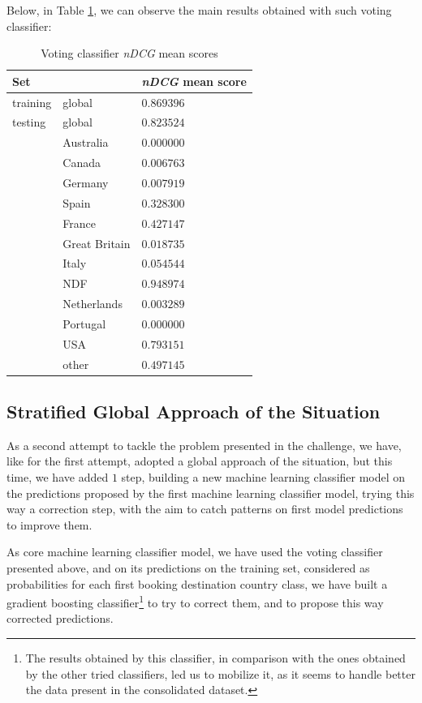 \documentclass[twocolumn, switch]{article}
\begin{document}
Below, in Table \ref{tab:vc}, we can observe the main results obtained with such voting classifier:

\begin{table}[H]
\caption{Voting classifier \textit{nDCG} mean scores}
\centering
\begin{tabular}{lll}
\toprule
Set & & \textit{nDCG} mean score \\
\midrule
training & global & $0.869396$ \\
testing & global & $0.823524$ \\
& Australia & $0.000000$ \\
& Canada & $0.006763$ \\
& Germany & $0.007919$ \\
& Spain & $0.328300$ \\
& France & $0.427147$ \\
& Great Britain & $0.018735$ \\
& Italy & $0.054544$ \\
& NDF & $0.948974$ \\
& Netherlands & $0.003289$ \\
& Portugal & $0.000000$ \\
& USA & $0.793151$ \\
& other & $0.497145$ \\
\bottomrule
\end{tabular}
\label{tab:vc}
\end{table}

\subsection{Stratified Global Approach of the Situation}

As a second attempt to tackle the problem presented in the challenge, we have, like for the first attempt, adopted a global approach of the situation, but this time, we have added $1$ step, building a new machine learning classifier model on the predictions proposed by the first machine learning classifier model, trying this way a correction step, with the aim to catch patterns on first model predictions to improve them.

As core machine learning classifier model, we have used the voting classifier presented above, and on its predictions on the training set, considered as probabilities for each first booking destination country class, we have built a gradient boosting classifier\footnote{The results obtained by this classifier, in comparison with the ones obtained by the other tried classifiers, led us to mobilize it, as it seems to handle better the data present in the consolidated dataset.} to try to correct them, and to propose this way corrected predictions.
\end{document}

